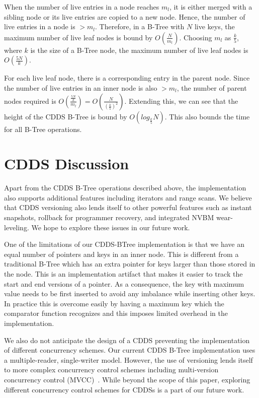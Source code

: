 When the number of live entries in a node reaches $m_{l}$, it is
either merged with a sibling node or its live entries are copied to a
new node.  Hence, the number of live entries in a node is $>m_{l}$.
Therefore, in a B-Tree with $N$ live keys, the maximum number of live
leaf nodes is bound by $O(\frac{N}{m_{l}})$. Choosing $m_{l}$ as
$\frac{k}{5}$, where $k$ is the size of a B-Tree node, the maximum
number of live leaf nodes is $O(\frac{5N}{k})$.

For each live leaf node, there is a corresponding entry in the parent
node.  Since the number of live entries in an inner node is also
$>m_{l}$, the number of parent nodes required is
$O\left(\frac{\frac{5N}{k}}{m_{l}}\right) =
O(\frac{N}{(\frac{k}{5})^2})$. Extending this, we can see that the
height of the CDDS B-Tree is bound by $O(log_{\frac{k}{5}}N)$.  This
also bounds the time for all B-Tree operations.

\section{CDDS Discussion}
\label{sec:cdds_discuss}

Apart from the CDDS B-Tree operations described above, the
implementation also supports additional features including iterators
and range scans.  We believe that CDDS versioning also lends itself to
other powerful features such as instant snapshots, rollback for
programmer recovery, and integrated NVBM wear-leveling.  We hope to
explore these issues in our future work. 

One of the limitations of our CDDS-BTree implementation is that we have
an equal number of pointers and keys in an inner node.  This is different
from a traditional B-Tree which has an extra pointer for keys larger
than those stored in the node. This is an implementation artifact that 
makes it easier to track the start and end versions of a pointer.  
As a consequence, the key with maximum value needs to be first inserted 
to avoid any imbalance while inserting other keys.  In practice this is 
overcome easily by having a maximum key which the comparator function 
recognizes and this imposes limited overhead in the implementation.  

We also do not anticipate the design of a CDDS preventing the
implementation of different concurrency schemes.  Our current CDDS
B-Tree implementation uses a multiple-reader, single-writer model.
However, the use of versioning lends itself to more complex
concurrency control schemes including multi-version concurrency
control (MVCC)~\citep{Bernstein81}.  While beyond the scope of this
paper, exploring different concurrency control schemes for CDDSs is a
part of our future work.

